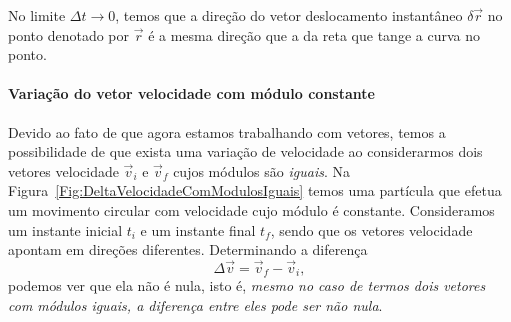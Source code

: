 \begin{marginfigure}[-1cm]
\caption{No limite $\Delta t \to 0$, temos que a direção do vetor deslocamento instantâneo $\delta\vec{r}$ no ponto denotado por $\vec{r}$ é a mesma direção que a da reta que tange a curva no ponto.\label{Fig:Dir_vel}}
\end{marginfigure}

\paragraph{Variação do vetor velocidade com módulo constante}

Devido ao fato de que agora estamos trabalhando com vetores, temos a possibilidade de que exista uma variação de velocidade ao considerarmos dois vetores velocidade $\vec{v}_i$ e $\vec{v}_f$ cujos módulos são \emph{iguais}. Na Figura~\ref{Fig:DeltaVelocidadeComModulosIguais} temos uma partícula que efetua um movimento circular com velocidade cujo módulo é constante. Consideramos um instante inicial $t_i$ e um instante final $t_f$, sendo que os vetores velocidade apontam em direções diferentes. Determinando a diferença
\begin{equation}
	\Delta \vec{v} = \vec{v}_f - \vec{v}_i,
\end{equation}
%
podemos ver que ela não é nula, isto é, \emph{mesmo no caso de termos dois vetores com módulos iguais, a diferença entre eles pode ser não nula}.

